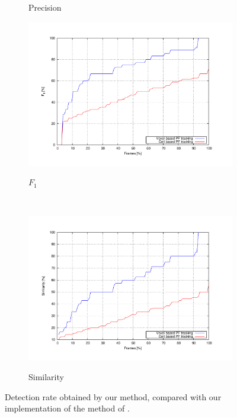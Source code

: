 \begin{figure}[th]
\begin{subfigure}[b]{0.5\textwidth}
                \caption{Precision}
                \label{fig:precisionChart}
        \end{subfigure}%
        
        \begin{subfigure}[b]{0.5\textwidth}
                \centering
                \includegraphics[width=\textwidth, trim=50 40 80 60,clip]{f1}\label{fig:cp05_f1}
                \caption{$F_1$}
                \label{fig:f1Chart}
        \end{subfigure}%
        ~ %
        \begin{subfigure}[b]{0.5\textwidth}
                \centering
                \includegraphics[width=\textwidth, trim=50 40 80 60,clip]{similarity}\label{fig:cp05_similarity}
                \caption{Similarity}
                \label{fig:similarityChart}
        \end{subfigure}
        \caption{Detection rate obtained by our method, compared with our implementation of the method of \cite{danescu2012particle}.}\label{fig:cp05_detection_rate}
\end{figure}


